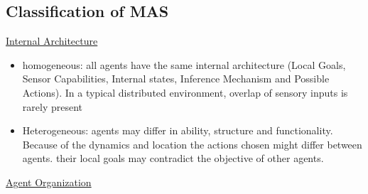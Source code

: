 \subsection{Classification of MAS}
\underline{Internal Architecture}
\begin{itemize}[noitemsep,nolistsep]
	\item homogeneous: all agents have the same internal architecture (Local Goals, Sensor Capabilities, Internal states, Inference Mechanism and Possible Actions). In a typical distributed environment, overlap of sensory inputs is rarely present
	\item Heterogeneous: agents may differ in ability, structure and functionality. Because of the dynamics and location the actions chosen might differ between agents. their local goals may contradict the objective of other agents.
\end{itemize}
\underline{Agent Organization}
